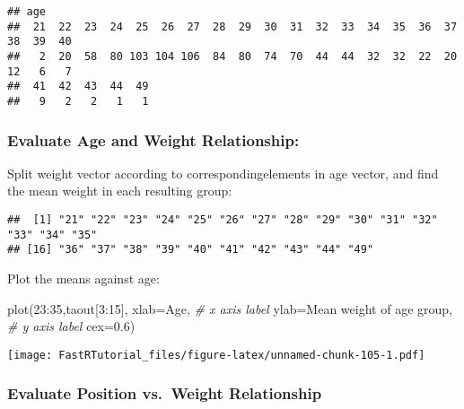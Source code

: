 \documentclass[
]{article}
\newenvironment{Shaded}{\begin{snugshade}}{\end{snugshade}}
\newcommand{\AttributeTok}[1]{\textcolor[rgb]{0.77,0.63,0.00}{#1}}
\newcommand{\CommentTok}[1]{\textcolor[rgb]{0.56,0.35,0.01}{\textit{#1}}}
\newcommand{\DecValTok}[1]{\textcolor[rgb]{0.00,0.00,0.81}{#1}}
\newcommand{\FloatTok}[1]{\textcolor[rgb]{0.00,0.00,0.81}{#1}}
\newcommand{\FunctionTok}[1]{\textcolor[rgb]{0.00,0.00,0.00}{#1}}
\newcommand{\NormalTok}[1]{#1}
\newcommand{\OtherTok}[1]{\textcolor[rgb]{0.56,0.35,0.01}{#1}}
\newcommand{\SpecialCharTok}[1]{\textcolor[rgb]{0.00,0.00,0.00}{#1}}
\newcommand{\StringTok}[1]{\textcolor[rgb]{0.31,0.60,0.02}{#1}}
\begin{document}
\begin{verbatim}
## age
##  21  22  23  24  25  26  27  28  29  30  31  32  33  34  35  36  37  38  39  40 
##   2  20  58  80 103 104 106  84  80  74  70  44  44  32  32  22  20  12   6   7 
##  41  42  43  44  49 
##   9   2   2   1   1
\end{verbatim}

\hypertarget{evaluate-age-and-weight-relationship}{%
\subsubsection{Evaluate Age and Weight
Relationship:}\label{evaluate-age-and-weight-relationship}}

Split weight vector according to correspondingelements in age vector,
and find the mean weight in each resulting group:

\begin{Shaded}
\end{Shaded}

\begin{verbatim}
##  [1] "21" "22" "23" "24" "25" "26" "27" "28" "29" "30" "31" "32" "33" "34" "35"
## [16] "36" "37" "38" "39" "40" "41" "42" "43" "44" "49"
\end{verbatim}

Plot the means against age:

\begin{Shaded}
\begin{Highlighting}[]
\FunctionTok{plot}\NormalTok{(}\DecValTok{23}\SpecialCharTok{:}\DecValTok{35}\NormalTok{,taout[}\DecValTok{3}\SpecialCharTok{:}\DecValTok{15}\NormalTok{],}
     \AttributeTok{xlab=}\StringTok{\textquotesingle{}Age\textquotesingle{}}\NormalTok{,    }\CommentTok{\# x axis label}
     \AttributeTok{ylab=}\StringTok{\textquotesingle{}Mean weight of age group\textquotesingle{}}\NormalTok{,   }\CommentTok{\# y axis label}
     \AttributeTok{cex=}\FloatTok{0.6}\NormalTok{)}
\end{Highlighting}
\end{Shaded}

\texttt{[image: FastRTutorial\_files/figure-latex/unnamed-chunk-105-1.pdf]}

\hypertarget{evaluate-position-vs.-weight-relationship}{%
\subsubsection{Evaluate Position vs.~Weight
Relationship}\label{evaluate-position-vs.-weight-relationship}}
\end{document}
